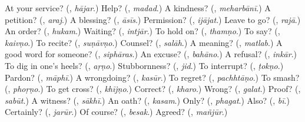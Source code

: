 \begin{tcolorbox}[breakable,colback=teal!4,colframe=teal!35!black,title={Before you move on}]
At your service? (\textbf{}, \emph{hājar}.) Help? (\textbf{}, \emph{madad}.) A kindness? (\textbf{}, \emph{meharbānī}.) A petition? (\textbf{}, \emph{araj}.) A blessing? (\textbf{}, \emph{āsīs}.) Permission? (\textbf{}, \emph{ijājat}.) Leave to go? (\textbf{}, \emph{rajā}.) An order? (\textbf{}, \emph{hukam}.) Waiting? (\textbf{}, \emph{intjār}.) To hold on? (\textbf{}, \emph{thamṇo}.) To say? (\textbf{}, \emph{kaivṇo}.) To recite? (\textbf{}, \emph{suṇāvṇo}.) Counsel? (\textbf{}, \emph{salāh}.) A meaning? (\textbf{}, \emph{matlab}.) A good word for someone? (\textbf{}, \emph{siphāras}.) An excuse? (\textbf{}, \emph{bahāno}.) A refusal? (\textbf{}, \emph{inkār}.) To dig in one's heels? (\textbf{}, \emph{aṛṇo}.) Stubbornness? (\textbf{}, \emph{jid}.) To interrupt? (\textbf{}, \emph{ṭokṇo}.) Pardon? (\textbf{}, \emph{māphī}.) A wrongdoing? (\textbf{}, \emph{kasūr}.) To regret? (\textbf{}, \emph{pachhtāṇo}.) To smash? (\textbf{}, \emph{phoṛṇo}.) To get cross? (\textbf{}, \emph{khījṇo}.) Correct? (\textbf{}, \emph{kharo}.) Wrong? (\textbf{}, \emph{galat}.) Proof? (\textbf{}, \emph{sabūt}.) A witness? (\textbf{}, \emph{sākhī}.) An oath? (\textbf{}, \emph{kasam}.) Only? (\textbf{}, \emph{phagat}.) Also? (\textbf{}, \emph{bī}.) Certainly? (\textbf{}, \emph{jarūr}.) Of course? (\textbf{}, \emph{besak}.) Agreed? (\textbf{}, \emph{mañjūr}.)
\end{tcolorbox}
